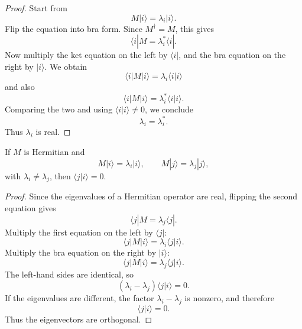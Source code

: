 \begin{proof}
Start from
\begin{equation}
M|i\rangle=\lambda_i |i\rangle.
\end{equation}
Flip the equation into bra form. Since \(M^\dagger=M\), this gives
\begin{equation}
\langle i|M=\lambda_i^* \langle i|.
\end{equation}
Now multiply the ket equation on the left by \(\langle i|\), and the bra equation on the right by \(|i\rangle\). We obtain
\begin{equation}
\langle i|M|i\rangle=\lambda_i \langle i|i\rangle
\end{equation}
and also
\begin{equation}
\langle i|M|i\rangle=\lambda_i^* \langle i|i\rangle.
\end{equation}
Comparing the two and using \(\langle i|i\rangle\neq 0\), we conclude
\begin{equation}
\lambda_i=\lambda_i^*.
\end{equation}
Thus \(\lambda_i\) is real.
\end{proof}

\begin{proposition}
If \(M\) is Hermitian and
\begin{equation}
M|i\rangle=\lambda_i |i\rangle,
\qquad
M|j\rangle=\lambda_j |j\rangle,
\end{equation}
with \(\lambda_i\neq \lambda_j\), then \(\langle j|i\rangle=0\).
\end{proposition}

\begin{proof}
Since the eigenvalues of a Hermitian operator are real, flipping the second equation gives
\begin{equation}
\langle j|M=\lambda_j \langle j|.
\end{equation}
Multiply the first equation on the left by \(\langle j|\):
\begin{equation}
\langle j|M|i\rangle=\lambda_i \langle j|i\rangle.
\end{equation}
Multiply the bra equation on the right by \(|i\rangle\):
\begin{equation}
\langle j|M|i\rangle=\lambda_j \langle j|i\rangle.
\end{equation}
The left-hand sides are identical, so
\begin{equation}
(\lambda_i-\lambda_j)\langle j|i\rangle=0.
\end{equation}
If the eigenvalues are different, the factor \(\lambda_i-\lambda_j\) is nonzero, and therefore
\begin{equation}
\langle j|i\rangle=0.
\end{equation}
Thus the eigenvectors are orthogonal.
\end{proof}

